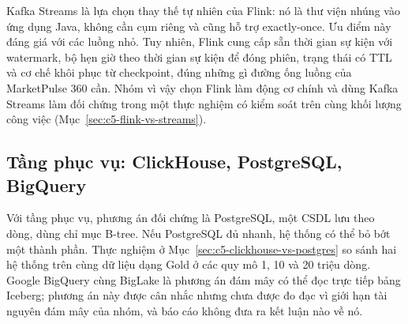 Kafka Streams là lựa chọn thay thế tự nhiên của Flink: nó là thư viện nhúng vào ứng dụng Java, không cần cụm riêng và cũng hỗ trợ exactly-once. Ưu điểm này đáng giá với các luồng nhỏ. Tuy nhiên, Flink cung cấp sẵn thời gian sự kiện với watermark, bộ hẹn giờ theo thời gian sự kiện để đóng phiên, trạng thái có TTL và cơ chế khôi phục từ checkpoint, đúng những gì đường ống luồng của MarketPulse 360 cần. Nhóm vì vậy chọn Flink làm động cơ chính và dùng Kafka Streams làm đối chứng trong một thực nghiệm có kiểm soát trên cùng khối lượng công việc (Mục~\ref{sec:c5-flink-vs-streams}).

\subsection{Tầng phục vụ: ClickHouse, PostgreSQL, BigQuery}
\label{sec:c2-alt-serving}

Với tầng phục vụ, phương án đối chứng là PostgreSQL, một CSDL lưu theo dòng, dùng chỉ mục B-tree. Nếu PostgreSQL đủ nhanh, hệ thống có thể bỏ bớt một thành phần. Thực nghiệm ở Mục~\ref{sec:c5-clickhouse-vs-postgres} so sánh hai hệ thống trên cùng dữ liệu dạng Gold ở các quy mô 1, 10 và 20 triệu dòng. Google BigQuery cùng BigLake là phương án đám mây có thể đọc trực tiếp bảng Iceberg; phương án này được cân nhắc nhưng chưa được đo đạc vì giới hạn tài nguyên đám mây của nhóm, và báo cáo không đưa ra kết luận nào về nó.
